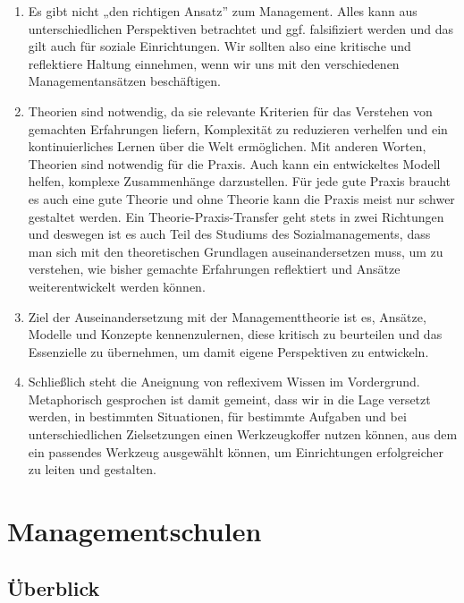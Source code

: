 \documentclass[
  letterpaper,
]{book}
\begin{document}
\begin{enumerate}
\def\labelenumi{\arabic{enumi}.}
\item
  Es gibt nicht „den richtigen Ansatz'' zum Management. Alles kann aus
  unterschiedlichen Perspektiven betrachtet und ggf. falsifiziert werden
  und das gilt auch für soziale Einrichtungen. Wir sollten also eine
  kritische und reflektiere Haltung einnehmen, wenn wir uns mit den
  verschiedenen Managementansätzen beschäftigen.
\item
  Theorien sind notwendig, da sie relevante Kriterien für das Verstehen
  von gemachten Erfahrungen liefern, Komplexität zu reduzieren verhelfen
  und ein kontinuierliches Lernen über die Welt ermöglichen. Mit anderen
  Worten, Theorien sind notwendig für die Praxis. Auch kann ein
  entwickeltes Modell helfen, komplexe Zusammenhänge darzustellen. Für
  jede gute Praxis braucht es auch eine gute Theorie und ohne Theorie
  kann die Praxis meist nur schwer gestaltet werden. Ein
  Theorie-Praxis-Transfer geht stets in zwei Richtungen und deswegen ist
  es auch Teil des Studiums des Sozialmanagements, dass man sich mit den
  theoretischen Grundlagen auseinandersetzen muss, um zu verstehen, wie
  bisher gemachte Erfahrungen reflektiert und Ansätze weiterentwickelt
  werden können.
\item
  Ziel der Auseinandersetzung mit der Managementtheorie ist es, Ansätze,
  Modelle und Konzepte kennenzulernen, diese kritisch zu beurteilen und
  das Essenzielle zu übernehmen, um damit eigene Perspektiven zu
  entwickeln.
\item
  Schließlich steht die Aneignung von reflexivem Wissen im Vordergrund.
  Metaphorisch gesprochen ist damit gemeint, dass wir in die Lage
  versetzt werden, in bestimmten Situationen, für bestimmte Aufgaben und
  bei unterschiedlichen Zielsetzungen einen Werkzeugkoffer nutzen
  können, aus dem ein passendes Werkzeug ausgewählt können, um
  Einrichtungen erfolgreicher zu leiten und gestalten.
\end{enumerate}

\section{Managementschulen}\label{managementschulen}

\subsection{Überblick}\label{ueberblick-managementschulen}
\end{document}
